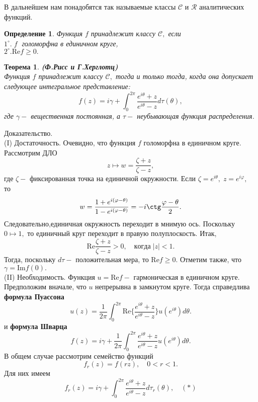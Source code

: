 \documentclass[12 pt, a4 paper]{article}
\theoremstyle{plain}   \newtheorem{Pro}{Задача}
\newtheorem{Def}{Определение}
\newtheorem{The}{Теорема}
\begin{document}
В дальнейшем нам понадобятся так называемые классы
$ \mathcal{C} $
и
$ \mathcal{R} $
аналитических функций.
\begin{Def}
Функция
$ f $
принадлежит классу
$ \mathcal{C}, $
если\\
$ 1^{\circ}. \; f \; $
голоморфна в единичном круге, \\
$ 2^{\circ}. \mathrm{Re} f \geq 0. $
\end{Def}
\begin{The}
{\bfseries (Ф.Рисс и Г.Херглотц)}
\\
Функция
$ f $
принадлежит классу
$ \mathcal{C} , $
тогда и только тогда, когда она допускает следующее
интегральное представление:
$$
  f(z)=i \gamma + \int _0 ^{2 \pi }
  \frac{e^{i \theta}+z}{e^{i \theta}-z} d \tau ( \theta ),
$$
где
$ \gamma - $
вещественная постоянная, а
$ \tau - $
неубывающая функция распределения.
\end{The}
{\Large Доказательство.}
\\
{\Large (I) Достаточность.}
Очевидно, что функция
$ f $
голоморфна в единичном круге.\\
Рассмотрим ДЛО
$$
  z \mapsto w=\frac{\zeta +z}{\zeta -z},
$$
где
$ \zeta - $
фиксированная точка на единичной окружности. Если
$ \zeta = e^{i \theta}, \;z=e^{i \varphi}, \; $
то
$$
  w=\frac{1+e^{i(\varphi - \theta )}}
  {1-e^{i(\varphi- \theta )}}=
  -i \ctg \frac{\varphi - \theta}{2}.
$$
Следовательно,единичная окружность переходит в мнимую ось.
Поскольку
$ 0 \mapsto 1 , $
то единичный круг переходит в правую полуплоскость. Итак,
$$
  \mathrm{Re} \frac{\zeta+z}{\zeta -z} >0, \quad когда \; |z|<1.
$$
Тогда, поскольку
$ d \tau - $
положительная мера, то
$ \mathrm{Re} f \geq 0. $
Отметим также, что
$ \gamma =\mathrm{Im} f(0). $
\\
{\Large (II) Необходимость.}
Функция
$ u=\mathrm{Re}f - $
гармоническая в единичном круге. Предположим вначале, что
$ u $
непрерывна в замкнутом круге. Тогда справедлива
{\bfseries формула Пуассона}
$$
  u(z)=\frac{1}{2\pi } \int _0 ^{2\pi} \mathrm{Re}
  \biggl \{ \frac{e^{i \theta} +z}{e^{i \theta} -z}
  \biggr \} u(e^{i \theta})d \theta .
$$
и
{\bfseries формула Шварца}
$$
  f(z)=i \gamma +\frac{1}{2\pi}\int _0 ^{2\pi}
  \frac{e^{i\theta} +z}{e^{i\theta} -z} u(e^{i\theta})d\theta .
$$
В общем случае рассмотрим семейство функций
$$
  f_r (z)=f(rz), \quad 0<r<1.
$$
Для них имеем
$$
  f_r (z)=i\gamma + \int _0 ^{2\pi}
  \frac{e^{i\theta} +z}{e^{i\theta} -z} d \tau _r (\theta ),
  \quad (\ast)
$$
\end{document}
